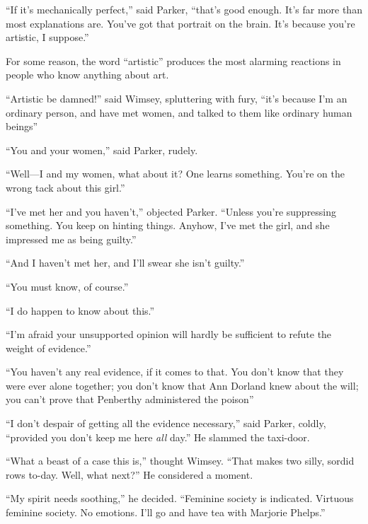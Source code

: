 \enquote{If it's mechanically perfect,} said Parker, \enquote{that's good enough. It's far more than most explanations are. You've got that portrait on the brain. It's because you're artistic, I suppose.}

For some reason, the word \enquote{artistic} produces the most alarming reactions in people who know anything about art.

\enquote{Artistic be damned!} said Wimsey, spluttering with fury, \enquote{it's because I'm an ordinary person, and have met women, and talked to them like ordinary human beings\longdash}

\enquote{You and your women,} said Parker, rudely.

\enquote{Well\allowbreak---\allowbreak I and my women, what about it? One learns something. You're on the wrong tack about this girl.}

\enquote{I've met her and you haven't,} objected Parker. \enquote{Unless you're suppressing something. You keep on hinting things. Anyhow, I've met the girl, and she impressed me as being guilty.}

\enquote{And I haven't met her, and I'll swear she isn't guilty.}

\enquote{You must know, of course.}

\enquote{I do happen to know about this.}

\enquote{I'm afraid your unsupported opinion will hardly be sufficient to refute the weight of evidence.}

\enquote{You haven't any real evidence, if it comes to that. You don't know that they were ever alone together; you don't know that Ann Dorland knew about the will; you can't prove that Penberthy administered the poison\longdash}

\enquote{I don't despair of getting all the evidence necessary,} said Parker, coldly, \enquote{provided you don't keep me here \textit{all} day.} He slammed the taxi-door.

\enquote{What a beast of a case this is,} thought Wimsey. \enquote{That makes two silly, sordid rows to-day. Well, what next?} He considered a moment.

\enquote{My spirit needs soothing,} he decided. \enquote{Feminine society is indicated. Virtuous feminine society. No emotions. I'll go and have tea with Marjorie Phelps.}